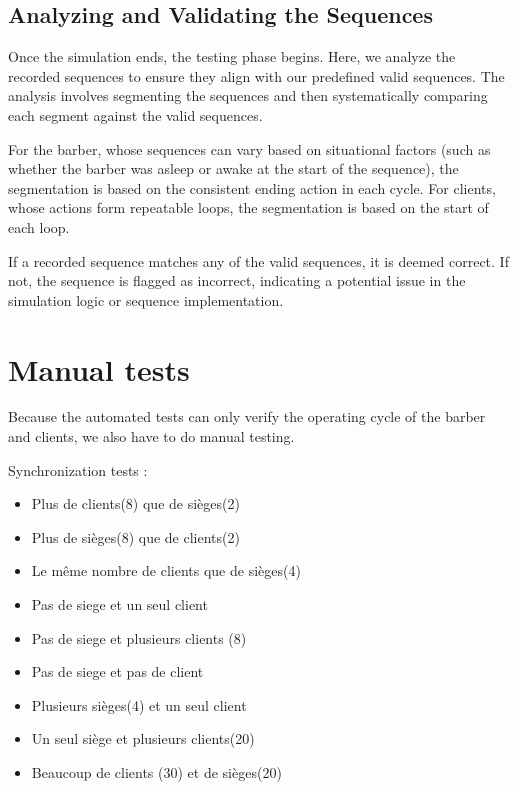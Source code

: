 \documentclass{article}
\begin{document}
    \subsection{Analyzing and Validating the Sequences}

    Once the simulation ends, the testing phase begins. Here, we analyze the recorded sequences to ensure they align with our predefined valid sequences. The analysis involves segmenting the sequences and then systematically comparing each segment against the valid sequences.

    For the barber, whose sequences can vary based on situational factors (such as whether the barber was asleep or awake at the start of the sequence), the segmentation is based on the consistent ending action in each cycle. For clients, whose actions form repeatable loops, the segmentation is based on the start of each loop.

    If a recorded sequence matches any of the valid sequences, it is deemed correct. If not, the sequence is flagged as incorrect, indicating a potential issue in the simulation logic or sequence implementation.


    \section{Manual tests}

    Because the automated tests can only verify the operating cycle of the barber and clients, we also have to do manual testing.

    Synchronization tests :
    \begin{itemize}
        \item Plus de clients(8) que de sièges(2)
        \item Plus de sièges(8) que de clients(2)
        \item Le même nombre de clients que de sièges(4)
        \item Pas de siege et un seul client
        \item Pas de siege et plusieurs clients (8)
        \item Pas de siege et pas de client
        \item Plusieurs sièges(4) et un seul client
        \item Un seul siège et plusieurs clients(20)
        \item Beaucoup de clients (30) et de sièges(20)
    \end{itemize}
\end{document}
